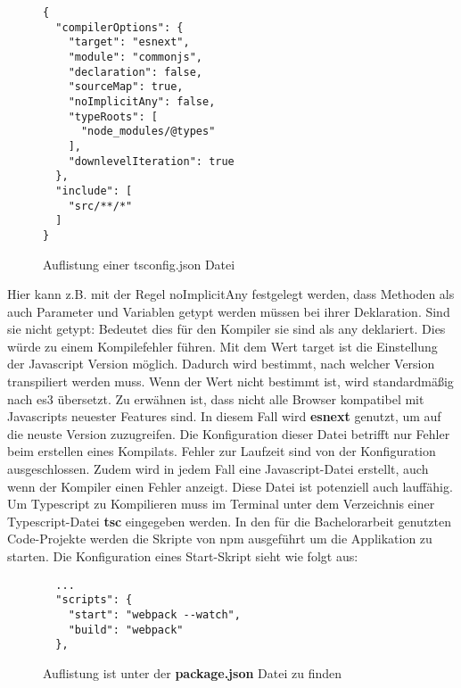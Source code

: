 \begin{figure}[H]
\begin{lstlisting}
{
  "compilerOptions": {
    "target": "esnext",
    "module": "commonjs",
    "declaration": false,
    "sourceMap": true,
    "noImplicitAny": false,
    "typeRoots": [
      "node_modules/@types"
    ],
    "downlevelIteration": true
  },
  "include": [
    "src/**/*"
  ]
} 
\end{lstlisting}
\caption{Auflistung einer tsconfig.json Datei}
\end{figure}

\noindent
Hier kann z.B. mit der Regel \glqq noImplicitAny\grqq{} festgelegt werden, dass Methoden als auch Parameter und Variablen getypt werden müssen bei ihrer Deklaration. Sind sie nicht getypt: Bedeutet dies für den Kompiler sie sind als any deklariert. Dies würde zu einem Kompilefehler führen.\cite{tsconfig} Mit dem Wert \glqq target\grqq{} ist die Einstellung der Javascript Version möglich. Dadurch wird bestimmt, nach welcher Version transpiliert werden muss. Wenn der Wert nicht bestimmt ist, wird standardmäßig nach es3 übersetzt. Zu erwähnen ist, dass nicht alle Browser kompatibel mit Javascripts neuester Features sind. In diesem Fall wird \textbf{esnext} genutzt, um auf die neuste Version zuzugreifen. Die Konfiguration dieser Datei betrifft nur Fehler beim erstellen eines Kompilats. Fehler zur Laufzeit sind von der Konfiguration ausgeschlossen. Zudem wird in jedem Fall eine Javascript-Datei erstellt, auch wenn der Kompiler einen Fehler anzeigt. Diese Datei ist potenziell auch lauffähig. Um Typescript zu Kompilieren muss im Terminal unter dem Verzeichnis einer Typescript-Datei \textbf{tsc} eingegeben werden. In den für die Bachelorarbeit genutzten Code-Projekte werden die Skripte von npm ausgeführt um die Applikation zu starten. Die Konfiguration eines Start-Skript sieht wie folgt aus:

\begin{figure}[H]
\begin{lstlisting}
  ...
  "scripts": {
    "start": "webpack --watch",
    "build": "webpack"
  }, 
\end{lstlisting}
\caption{Auflistung ist unter der \textbf{package.json} Datei zu finden}
\end{figure}

